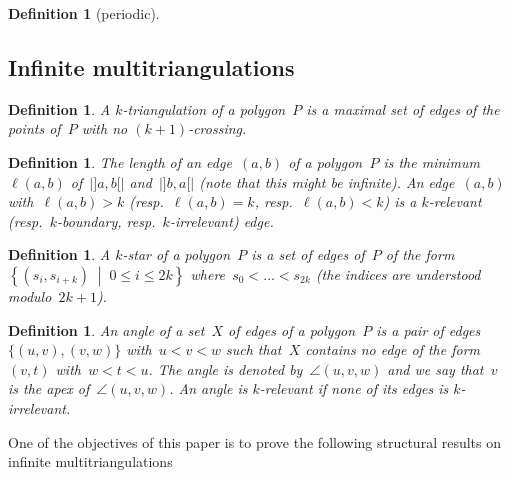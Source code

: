 \documentclass{amsart}
\newtheorem{definition}[theorem]{Definition}
\theoremstyle{remark}
\newcommand{\darkblue}{\color{darkblue}} %
\newcommand{\defn}[1]{\textsl{\darkblue #1}} %
\newcommand{\set}[2]{\left\{ #1 \;\middle|\; #2 \right\}} %
\begin{document}
\begin{definition}[periodic]

\end{definition}

\subsection{Infinite multitriangulations}

\begin{definition}%
A \defn{$k$-triangulation} of a polygon~$P$ is a maximal set of edges of the points of~$P$ with no $(k+1)$-crossing.
\end{definition}

\begin{definition}
The \defn{length} of an edge~$(a,b)$ of a polygon~$P$ is the minimum~$\ell(a,b)$ of~$|{]a,b[}|$ and~$|{]b,a[}|$ (note that this might be infinite).
An edge~$(a,b)$ with~$\ell(a,b) > k$ (resp.~$\ell(a,b) = k$, resp.~$\ell(a,b) < k$) is a \defn{$k$-relevant} (resp.~\defn{$k$-boundary}, resp.~\defn{$k$-irrelevant}) edge.
\end{definition}


\begin{definition}
A \defn{$k$-star} of a polygon~$P$ is a set of edges of~$P$ of the form~$\set{(s_i, s_{i+k})}{0 \le i \le 2k}$ where~$s_0 < \dots < s_{2k}$ (the indices are understood modulo~$2k+1$).
\end{definition}

\begin{definition}
An \defn{angle} of a set~$X$ of edges of a polygon~$P$ is a pair of edges~$\{(u,v), (v,w)\}$ with~$u < v < w$ such that~$X$ contains no edge of the form~$(v,t)$ with~$w < t < u$. The angle is denoted by~$\angle(u,v,w)$ and we say that~$v$ is the \defn{apex} of~$\angle(u,v,w)$. An angle is \defn{$k$-relevant} if none of its edges is $k$-irrelevant.
\end{definition}

One of the objectives of this paper is to prove the following structural results on infinite multitriangulations
\end{document}
